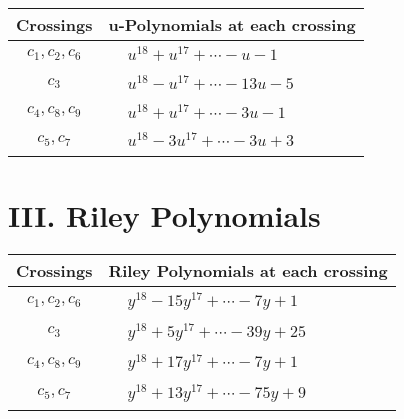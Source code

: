 \documentclass[1p]{elsarticle_modified}
\theoremstyle{definition}
\begin{document}
\begin{tabular}{m{50pt}|m{274pt}}
Crossings & \hspace{64pt}u-Polynomials at each crossing \\
\hline $$\begin{aligned}c_{1},c_{2},c_{6}\end{aligned}$$&$\begin{aligned}
&u^{18}+u^{17}+\cdots- u-1
\end{aligned}$\\
\hline $$\begin{aligned}c_{3}\end{aligned}$$&$\begin{aligned}
&u^{18}- u^{17}+\cdots-13 u-5
\end{aligned}$\\
\hline $$\begin{aligned}c_{4},c_{8},c_{9}\end{aligned}$$&$\begin{aligned}
&u^{18}+u^{17}+\cdots-3 u-1
\end{aligned}$\\
\hline $$\begin{aligned}c_{5},c_{7}\end{aligned}$$&$\begin{aligned}
&u^{18}-3 u^{17}+\cdots-3 u+3
\end{aligned}$\\
\hline
\end{tabular}\newpage\renewcommand{\arraystretch}{1}
\centering \section*{ III. Riley Polynomials}
\begin{tabular}{m{50pt}|m{274pt}}
Crossings & \hspace{64pt}Riley Polynomials at each crossing \\
\hline $$\begin{aligned}c_{1},c_{2},c_{6}\end{aligned}$$&$\begin{aligned}
&y^{18}-15 y^{17}+\cdots-7 y+1
\end{aligned}$\\
\hline $$\begin{aligned}c_{3}\end{aligned}$$&$\begin{aligned}
&y^{18}+5 y^{17}+\cdots-39 y+25
\end{aligned}$\\
\hline $$\begin{aligned}c_{4},c_{8},c_{9}\end{aligned}$$&$\begin{aligned}
&y^{18}+17 y^{17}+\cdots-7 y+1
\end{aligned}$\\
\hline $$\begin{aligned}c_{5},c_{7}\end{aligned}$$&$\begin{aligned}
&y^{18}+13 y^{17}+\cdots-75 y+9
\end{aligned}$\\
\hline
\end{tabular}
\vskip 2pc
\end{document}
